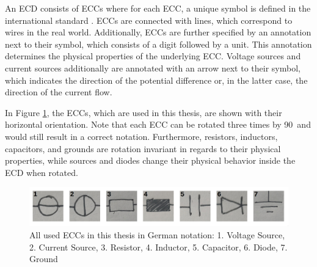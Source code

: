 
An \ac{ECD} consists of \acp{ECC} where for each \ac{ECC}, a unique symbol is defined in the international standard \cite{iec60617}.
\acp{ECC} are connected with lines, which correspond to wires in the real world.
Additionally, \acp{ECC} are further specified by an annotation next to their symbol, which consists of a digit followed by a unit.
This annotation determines the physical properties of the underlying \ac{ECC}.
Voltage sources and current sources additionally are annotated with an arrow next to their symbol, which indicates the direction of the potential difference or, in the latter case, the direction of the current flow.

In Figure \ref{fig:used_eccs}, the \acp{ECC}, which are used in this thesis, are shown with their horizontal orientation.
Note that each \ac{ECC} can be rotated three times by 90\textdegree\ and would still result in a correct notation.
Furthermore, resistors, inductors, capacitors, and grounds are rotation invariant in regards to their physical properties, while sources and diodes change their physical behavior inside the \ac{ECD} when rotated.


\begin{figure}
\begin{center}
    \includegraphics[width=16cm]{imgs/eccs/all.png}
    \caption{All used \acp{ECC} in this thesis in German notation: 1. Voltage Source, 2. Current Source, 3. Resistor, 4. Inductor, 5. Capacitor, 6. Diode, 7. Ground}
    \label{fig:used_eccs}
\end{center}
\end{figure}
